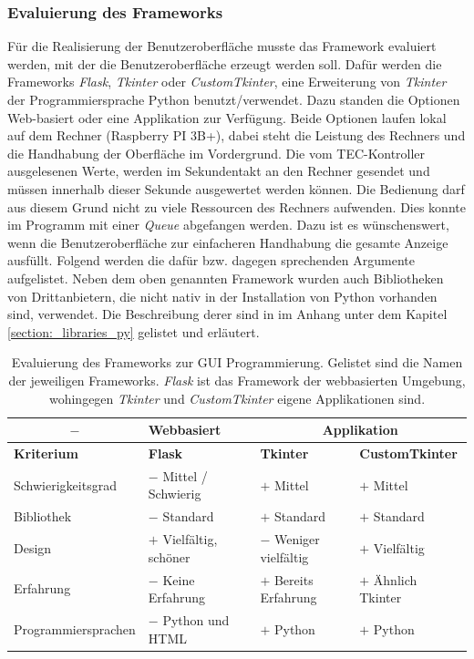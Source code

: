 \subsubsection{Evaluierung des Frameworks}
Für die Realisierung der Benutzeroberfläche musste das Framework evaluiert werden, mit der die Benutzeroberfläche erzeugt werden soll. Dafür werden die Frameworks \textit{Flask}, \textit{Tkinter} oder \textit{CustomTkinter}, eine Erweiterung von \textit{Tkinter} der Programmiersprache Python benutzt/verwendet. Dazu standen die Optionen Web-basiert oder eine Applikation zur Verfügung. Beide Optionen laufen lokal auf dem Rechner (Raspberry PI 3B+), dabei steht die Leistung des Rechners und die Handhabung der Oberfläche im Vordergrund. Die vom TEC-Kontroller ausgelesenen Werte, werden im Sekundentakt an den Rechner gesendet und müssen innerhalb dieser Sekunde ausgewertet werden können. Die Bedienung darf aus diesem Grund nicht zu viele Ressourcen des Rechners aufwenden. Dies konnte im Programm mit einer \textit{Queue} abgefangen werden. Dazu ist es wünschenswert, wenn die Benutzeroberfläche zur einfacheren Handhabung die gesamte Anzeige ausfüllt. Folgend werden die dafür bzw. dagegen sprechenden Argumente aufgelistet.
Neben dem oben genannten Framework wurden auch Bibliotheken von Drittanbietern, die nicht nativ in der Installation von Python vorhanden sind, verwendet. Die Beschreibung derer sind in im Anhang unter dem Kapitel \ref{section:_libraries_py} gelistet und erläutert.

\begin{table}[H]
    \centering
    \begin{tabular}{l|l|l|l}
        \multicolumn{1}{c|}{$-$}&   \textbf{Webbasiert}&        \multicolumn{2}{c}{\textbf{Applikation}}\\
        \hline
        \textbf{Kriterium}&         \textbf{Flask}&             \textbf{Tkinter}&           \textbf{CustomTkinter}\\
        \hline
        Schwierigkeitsgrad&         $-$ Mittel / Schwierig&     $+$ Mittel&                 $+$ Mittel\\
        Bibliothek&                 $-$ Standard&               $+$ Standard&               $+$ Standard\\
        Design&                     $+$ Vielfältig, schöner&    $-$ Weniger vielfältig&     $+$ Vielfältig\\
        Erfahrung&                  $-$ Keine Erfahrung&        $+$ Bereits Erfahrung&      $+$ Ähnlich Tkinter\\
        Programmiersprachen&        $-$ Python und HTML&        $+$ Python&                 $+$ Python\\
    \end{tabular}
    \caption{Evaluierung des Frameworks zur GUI Programmierung. Gelistet sind die Namen der jeweiligen Frameworks. \textit{Flask} ist das Framework der webbasierten Umgebung, wohingegen \textit{Tkinter} und \textit{CustomTkinter} eigene Applikationen sind.}
    \label{tab:gui_programming}
\end{table}

